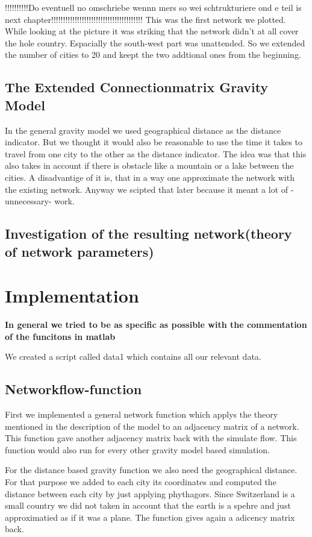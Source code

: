 \documentclass[11pt]{article}
\begin{document}
!!!!!!!!!!Do eventuell no omschriebe wennn mers so wei schtrukturiere ond e teil is next chapter!!!!!!!!!!!!!!!!!!!!!!!!!!!!!!!!!!!!!!!
This was the first network we plotted. While looking at the picture it was striking that the network didn't at all cover the hole country. Espacially the south-west part was unattended. So we extended the number of cities to 20 and keept the two addtional ones from the beginning.


\subsection{The Extended Connectionmatrix Gravity Model}
In the general gravity model we used geographical distance as the distance indicator. But we thought it would also be reasonable to use the time it takes to travel from one city to the other as the distance indicator. The idea was that this also takes in account if there is obstacle like a mountain or a lake between the cities. A disadvantige of it is, that in a way one approximate the network with the existing network. Anyway we scipted that later because it meant a lot of -unnecessary- work.


\subsection{Investigation of the resulting network(theory of network parameters)}



\section{Implementation}
\textbf{In general we tried to be as specific as possible with the commentation of the funcitons in matlab}

We created a script called data1 which contains all our relevant data.

\subsection{Networkflow-function}
First we implemented a general network function which applys the theory mentioned in the description of the model to an adjacency matrix of a network. This function gave another adjacency matrix back with the simulate flow. This function would also run for every other gravity model based simulation.\newline

For the distance based gravity function we also need the geographical distance. For that purpose we added to each city its coordinates and computed the distance between each city by just applying phythagors. Since Switzerland is a small country we did not taken in account that the earth is a spehre and just approximatied as if it was a plane. The function gives again a adicency matrix back.
\end{document}
